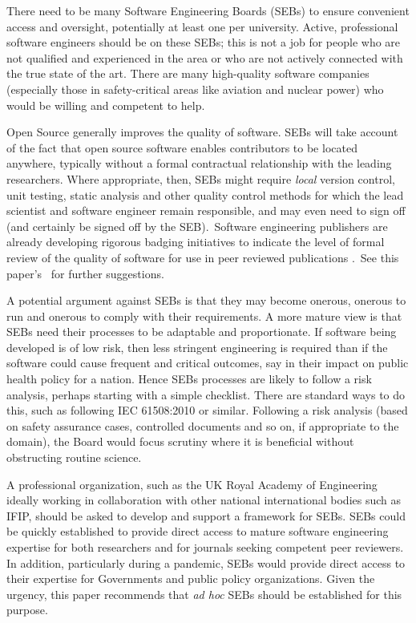 There need to be many Software Engineering Boards (SEBs) to ensure convenient access and oversight, potentially at least one per university. Active, professional software engineers should be on these SEBs; this is not a job for people who are not qualified and experienced in the area or who are not actively connected with the true state of the art. There are many high-quality software companies (especially those in safety-critical areas like aviation and nuclear power) who would be willing and competent to help.

Open Source generally improves the quality of software. SEBs will take account of the fact that open source software enables contributors to be located anywhere, typically without a formal contractual relationship with the leading researchers. Where appropriate, then, SEBs might require \emph{local\/} version control, unit testing, static analysis {and other quality control methods for which the lead scientist and software engineer remain responsible, and may even need to sign off (and certainly be signed off by the SEB\@).}\ {Software engineering publishers are already developing rigorous badging initiatives to indicate the level of formal review of the quality of software for use in peer reviewed publications \cite{acm-artifacts}.}\ {See this paper's \supplement\ for further suggestions.}

A potential argument against SEBs is that they may become onerous, onerous to run and onerous to comply with their requirements. A more mature view is that SEBs need their processes to be adaptable and proportionate. If software being developed is of low risk, then less stringent engineering is required than if the software could cause frequent and critical outcomes, say in their impact on public health policy for a nation. Hence SEBs processes are likely to follow a risk analysis, perhaps starting with a simple checklist. {There are standard ways to do this, such as following IEC 61508:2010 \cite{redmill,iec61508} or similar. Following a risk analysis (based on safety assurance cases, controlled documents and so on, if appropriate to the domain), the Board would focus scrutiny where it is beneficial without obstructing routine science.}

A professional organization, such as the UK Royal Academy of Engineering ideally working in collaboration with other national international bodies such as IFIP, should be asked to develop and support a framework for SEBs. SEBs could be quickly established to provide direct access to mature software engineering expertise for both researchers and for journals seeking competent peer reviewers. In addition, particularly during a pandemic, SEBs would provide direct access to their expertise for Governments and public policy organizations. Given the urgency, this paper recommends that \emph{ad hoc\/} SEBs should be established for this purpose.

